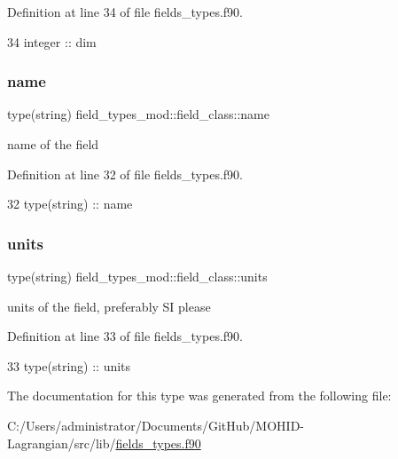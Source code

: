 Definition at line 34 of file fields\+\_\+types.\+f90.


\begin{DoxyCode}
34         \textcolor{keywordtype}{integer} :: dim
\end{DoxyCode}
\mbox{\label{structfield__types__mod_1_1field__class_ab7089941565bc867fe3f39765b0047e9}} 
\subsubsection{\texorpdfstring{name}{name}}
{\footnotesize\ttfamily type(string) field\+\_\+types\+\_\+mod\+::field\+\_\+class\+::name\hspace{0.3cm}{\ttfamily [private]}}



name of the field 



Definition at line 32 of file fields\+\_\+types.\+f90.


\begin{DoxyCode}
32         \textcolor{keywordtype}{type}(string) :: name
\end{DoxyCode}
\mbox{\label{structfield__types__mod_1_1field__class_a9bdad661b68fbf5c6a93c55edfda0084}} 
\subsubsection{\texorpdfstring{units}{units}}
{\footnotesize\ttfamily type(string) field\+\_\+types\+\_\+mod\+::field\+\_\+class\+::units\hspace{0.3cm}{\ttfamily [private]}}



units of the field, preferably SI please 



Definition at line 33 of file fields\+\_\+types.\+f90.


\begin{DoxyCode}
33         \textcolor{keywordtype}{type}(string) :: units
\end{DoxyCode}


The documentation for this type was generated from the following file\+:\begin{DoxyCompactItemize}
\item 
C\+:/\+Users/administrator/\+Documents/\+Git\+Hub/\+M\+O\+H\+I\+D-\/\+Lagrangian/src/lib/\mbox{\hyperlink{fields__types_8f90}{fields\+\_\+types.\+f90}}\end{DoxyCompactItemize}
